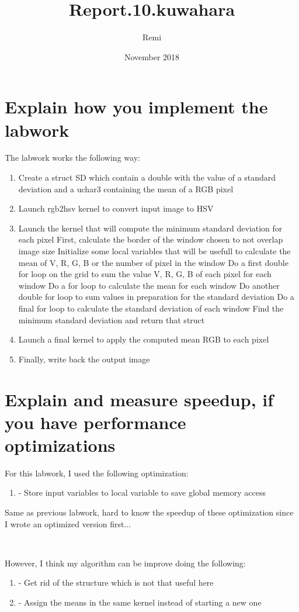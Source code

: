 \documentclass{article}
\title{Report.10.kuwahara}
\author{Remi}
\date{November 2018}
\begin{document}
\maketitle

\section{Explain how you implement the labwork}

The labwork works the following way:
\begin{enumerate}  
\item Create a struct SD which contain a double with the value of a standard deviation and a uchar3 containing the mean of a RGB pixel
\item Launch rgb2hsv kernel to convert input image to HSV
\item Launch the kernel that will compute the minimum standard deviation for each pixel
    \subitem First, calculate the border of the window chosen to not overlap image size
    \subitem Initialize some local variables that will be usefull to calculate the mean of V, R, G, B or the number of pixel in the window
    \subitem Do a first double for loop on the grid to sum the value V, R, G, B of each pixel for each window
    \subitem Do a for loop to calculate the mean for each window
    \subitem Do another double for loop to sum values in preparation for the standard deviation
    \subitem Do a final for loop to calculate the standard deviation of each window
    \subitem Find the minimum standard deviation and return that struct
\item Launch a final kernel to apply the computed mean RGB to each pixel
\item Finally, write back the output image
\end{enumerate}

\section{Explain and measure speedup, if you have performance optimizations}
For this labwork, I used the following optimization:
\begin{enumerate}  
\item - Store input variables to local variable to save global memory access
\end{enumerate}

Same as previous labwork, hard to know the speedup of these optimization since I wrote an optimized version first...

\ 

However, I think my algorithm can be improve doing the following:
\begin{enumerate}  
\item - Get rid of the structure which is not that useful here
\item - Assign the means in the same kernel instead of starting a new one
\end{enumerate}
\end{document}
